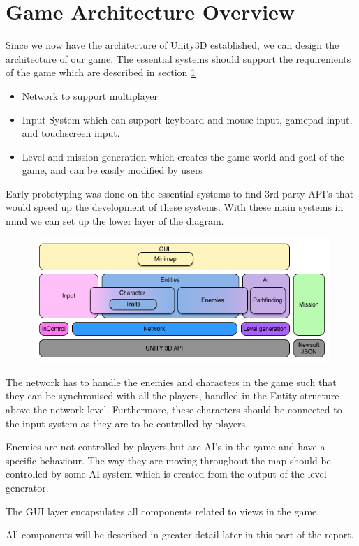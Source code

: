 \section{Game Architecture Overview}
Since we now have the architecture of Unity3D established, we can design the architecture of our game.
The essential systems should support the requirements of the game which are described in section \ref{} 
\begin{itemize}
    \item Network to support multiplayer
    \item Input System which can support keyboard and mouse input, gamepad input, and touchscreen input.
    \item Level and mission generation which creates the game world and goal of the game, and can be easily modified by users
\end{itemize}
Early prototyping was done on the essential systems to find 3rd party API's that would speed up the development of these systems.
With these main systems in mind we can set up the lower layer of the diagram.

\begin{figure}
\includegraphics[width = \textwidth]{figures/architecture/game_architecture_overview.png}
\end{figure}

The network has to handle the enemies and characters in the game such that they can be synchronised with all the players, handled in the Entity structure above the network level.
Furthermore, these characters should be connected to the input system as they are to be controlled by players.

Enemies are not controlled by players but are AI's in the game and have a specific behaviour.
The way they are moving throughout the map should be controlled by some AI system which is created from the output of the level generator.

The GUI layer encapsulates all components related to views in the game.

All components will be described in greater detail later in this part of the report.
